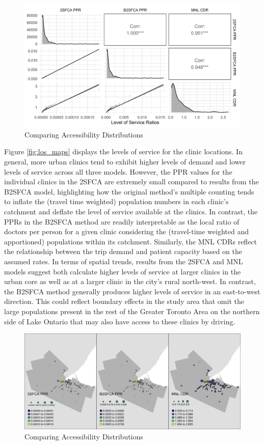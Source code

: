 \documentclass[]{elsarticle} %
\begin{document}
\begin{figure}
\includegraphics[width=1\linewidth]{./img/pair_plot_ppr} \caption{\label{fig:ppr_dist}Comparing Accessibility Distributions}\label{fig:ppr_dist_fig}
\end{figure}

Figure \ref{fig:los_maps} displays the levels of service for the clinic
locations. In general, more urban clinics tend to exhibit higher levels
of demand and lower levels of service across all three models. However,
the PPR values for the individual clinics in the 2SFCA are extremely
small compared to results from the B2SFCA model, highlighting how the
original method's multiple counting tends to inflate the (travel time
weighted) population numbers in each clinic's catchment and deflate the
level of service available at the clinics. In contrast, the PPRs in the
B2SFCA method are readily interpretable as the local ratio of doctors
per person for a given clinic considering the (travel-time weighted and
apportioned) populations within its catchment. Similarly, the MNL CDRs
reflect the relationship between the trip demand and patient capacity
based on the assumed rates. In terms of spatial trends, results from the
2SFCA and MNL models suggest both calculate higher levels of service at
larger clinics in the urban core as well as at a larger clinic in the
city's rural north-west. In contrast, the B2SFCA method generally
produces higher levels of service in an east-to-west direction. This
could reflect boundary effects in the study area that omit the large
populations present in the rest of the Greater Toronto Area on the
northern side of Lake Ontario that may also have access to these clinics
by driving.

\begin{figure}
\includegraphics[width=1\linewidth]{./img/los_maps} \caption{\label{fig:los_maps}Comparing Accessibility Distributions}\label{fig:los_maps_fig}
\end{figure}
\end{document}
